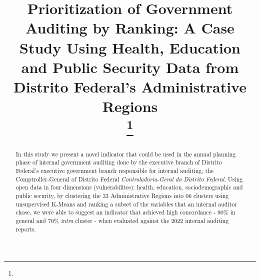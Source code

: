 \documentclass[conference]{IEEEtran}
\begin{document}
\title{Prioritization of Government Auditing by Ranking: A Case Study Using Health, Education and Public Security Data from Distrito Federal's Administrative Regions \\
{\footnotesize \textsuperscript{}}
\thanks{}
}




\author{
\and
{}
\and
{}
}

\maketitle
\thispagestyle{fancy}


\begin{abstract}
In this study we present a novel indicator that could be used in the annual planning phase of internal government auditing done by the executive branch of Distrito Federal's executive government branch responsible for internal auditing, the Comptroller-General of Distrito Federal \textit{Controladoria-Geral do Distrito Federal}. Using open data in four dimensions (vulnerabilites): health, education, sociodemographic and public security, by clustering the 33 Administrative Regions into 06 clusters using unsupervised K-Means and ranking a subset of the variables that an internal auditor chose, we were able to suggest an indicator that achieved high concordance - 90\% in general and 70\% \textit{intra} cluster - when evaluated against the 2022 internal auditing reports.
\end{abstract}
\end{document}
